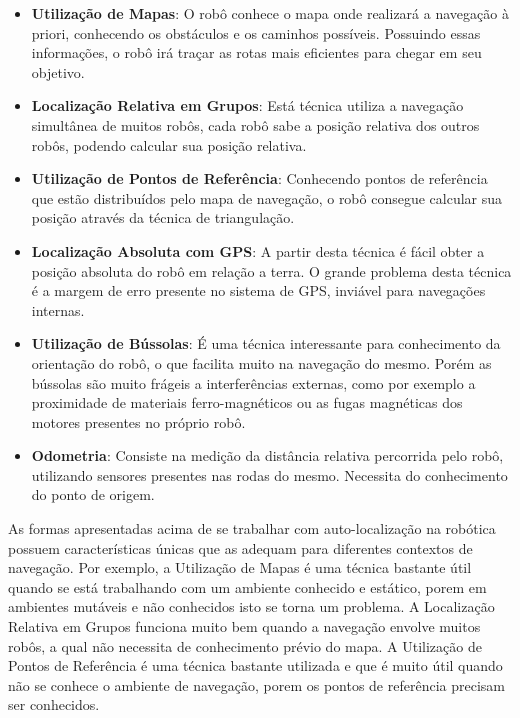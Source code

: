 	\begin{itemize}
		\item \textbf{Utilização de Mapas}: O robô conhece o mapa onde realizará a navegação à priori, conhecendo os obstáculos e os caminhos possíveis. Possuindo essas informações, o robô irá traçar as rotas mais eficientes para chegar em seu objetivo.

		\item \textbf{Localização Relativa em Grupos}: Está técnica utiliza a navegação simultânea de muitos robôs, cada robô sabe a posição relativa dos outros robôs, podendo calcular sua posição relativa.

		\item \textbf{Utilização de Pontos de Referência}: Conhecendo pontos de referência que estão distribuídos pelo mapa de navegação, o robô consegue calcular sua posição através da técnica de triangulação.

		\item \textbf{Localização Absoluta com GPS}: A partir desta técnica é fácil obter a posição absoluta do robô em relação a terra. O grande problema desta técnica é a margem de erro presente no sistema de GPS, inviável para navegações internas.

		\item \textbf{Utilização de Bússolas}: É uma técnica interessante para conhecimento da orientação do robô, o que facilita muito na navegação do mesmo. Porém as bússolas são muito frágeis a interferências externas, como por exemplo a proximidade de materiais ferro-magnéticos ou as fugas magnéticas dos motores presentes no próprio robô.

		\item \textbf{Odometria}: Consiste na medição da distância relativa percorrida pelo robô, utilizando sensores presentes nas rodas do mesmo. Necessita do conhecimento do ponto de origem.
		 
	\end{itemize}

	As formas apresentadas acima de se trabalhar com auto-localização na robótica possuem características únicas que as adequam para diferentes contextos de navegação. Por exemplo, a Utilização de Mapas é uma técnica bastante útil quando se está trabalhando com um ambiente conhecido e estático, porem em ambientes mutáveis e não conhecidos isto se torna um problema. A Localização Relativa em Grupos funciona muito bem quando a navegação envolve muitos robôs, a qual não necessita de conhecimento prévio do mapa. A Utilização de Pontos de Referência é uma técnica bastante utilizada e que é muito útil quando não se conhece o ambiente de navegação, porem os pontos de referência precisam ser conhecidos.

